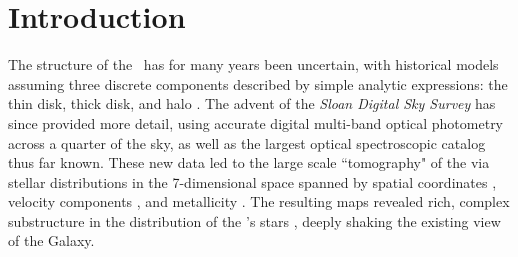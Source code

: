 \section{Introduction}
The structure of the \mw\, has for many years been uncertain, with historical models assuming three discrete components described by simple analytic expressions: the thin disk, thick disk, and halo \citep{1980ApJS...44...73B, 1989ARA&A..27..555G,1993ARA&A..31..575M}. 
The advent of the \emph{Sloan Digital Sky Survey} \citep[\sdss, ][]{2000AJ....120.1579Y} has since provided more detail, using accurate digital multi-band optical photometry across a quarter of the sky, as well as the largest optical spectroscopic catalog thus far known. 
These new data led to the large scale ``tomography" of the \mw\; via stellar distributions in the 7-dimensional space spanned by spatial coordinates \citep{2008ApJ...673..864J}, velocity components \citep{2010ApJ...716....1B}, and metallicity \citep{2008ApJ...684..287I}. The resulting maps revealed rich, complex substructure in the distribution of the \mw's stars \citep[e.g.][]{2000AJ....120..963I,2000ApJ...540..825Y,2001ApJ...554L..33V,2002ApJ...569..245N,2003ApJ...599.1082M,2006ApJ...642L.137B,2006ApJ...651L..29G,2006AJ....132..714V}, deeply shaking the existing view of the Galaxy. 

